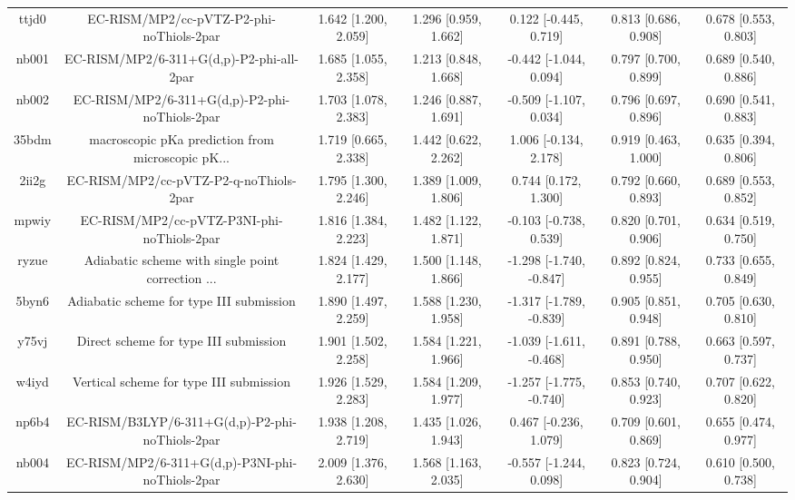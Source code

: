 \documentclass{article}
\begin{document}
\begin{center}
\begin{longtable}{|ccccccc|}
 ttjd0 &           EC-RISM/MP2/cc-pVTZ-P2-phi-noThiols-2par &  1.642 [1.200, 2.059] &  1.296 [0.959, 1.662] &    0.122 [-0.445, 0.719] &  0.813 [0.686, 0.908] &   0.678 [0.553, 0.803] \\
 nb001 &           EC-RISM/MP2/6-311+G(d,p)-P2-phi-all-2par &  1.685 [1.055, 2.358] &  1.213 [0.848, 1.668] &   -0.442 [-1.044, 0.094] &  0.797 [0.700, 0.899] &   0.689 [0.540, 0.886] \\
 nb002 &      EC-RISM/MP2/6-311+G(d,p)-P2-phi-noThiols-2par &  1.703 [1.078, 2.383] &  1.246 [0.887, 1.691] &   -0.509 [-1.107, 0.034] &  0.796 [0.697, 0.896] &   0.690 [0.541, 0.883] \\
 35bdm &  macroscopic pKa prediction from microscopic pK... &  1.719 [0.665, 2.338] &  1.442 [0.622, 2.262] &    1.006 [-0.134, 2.178] &  0.919 [0.463, 1.000] &   0.635 [0.394, 0.806] \\
 2ii2g &             EC-RISM/MP2/cc-pVTZ-P2-q-noThiols-2par &  1.795 [1.300, 2.246] &  1.389 [1.009, 1.806] &     0.744 [0.172, 1.300] &  0.792 [0.660, 0.893] &   0.689 [0.553, 0.852] \\
 mpwiy &         EC-RISM/MP2/cc-pVTZ-P3NI-phi-noThiols-2par &  1.816 [1.384, 2.223] &  1.482 [1.122, 1.871] &   -0.103 [-0.738, 0.539] &  0.820 [0.701, 0.906] &   0.634 [0.519, 0.750] \\
 ryzue &  Adiabatic scheme with single point correction ... &  1.824 [1.429, 2.177] &  1.500 [1.148, 1.866] &  -1.298 [-1.740, -0.847] &  0.892 [0.824, 0.955] &   0.733 [0.655, 0.849] \\
 5byn6 &           Adiabatic scheme for type III submission &  1.890 [1.497, 2.259] &  1.588 [1.230, 1.958] &  -1.317 [-1.789, -0.839] &  0.905 [0.851, 0.948] &   0.705 [0.630, 0.810] \\
 y75vj &              Direct scheme for type III submission &  1.901 [1.502, 2.258] &  1.584 [1.221, 1.966] &  -1.039 [-1.611, -0.468] &  0.891 [0.788, 0.950] &   0.663 [0.597, 0.737] \\
 w4iyd &            Vertical scheme for type III submission &  1.926 [1.529, 2.283] &  1.584 [1.209, 1.977] &  -1.257 [-1.775, -0.740] &  0.853 [0.740, 0.923] &   0.707 [0.622, 0.820] \\
 np6b4 &    EC-RISM/B3LYP/6-311+G(d,p)-P2-phi-noThiols-2par &  1.938 [1.208, 2.719] &  1.435 [1.026, 1.943] &    0.467 [-0.236, 1.079] &  0.709 [0.601, 0.869] &   0.655 [0.474, 0.977] \\
 nb004 &    EC-RISM/MP2/6-311+G(d,p)-P3NI-phi-noThiols-2par &  2.009 [1.376, 2.630] &  1.568 [1.163, 2.035] &   -0.557 [-1.244, 0.098] &  0.823 [0.724, 0.904] &   0.610 [0.500, 0.738] \\

\end{longtable}
\end{center}
\end{document}
